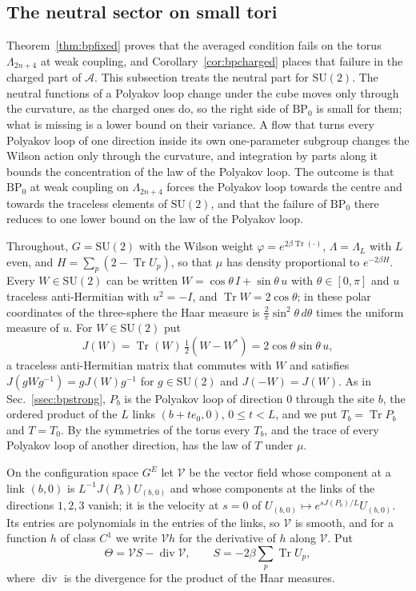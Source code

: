 \documentclass[aps,prd,twocolumn,superscriptaddress,nofootinbib,longbibliography,floatfix,amsmath,amssymb,10pt]{revtex4-2}
\theoremstyle{definition}
\theoremstyle{remark}
\newcommand{\SU}{\mathrm{SU}}
\newcommand{\Tr}{\operatorname{Tr}}
\begin{document}
\subsection{The neutral sector on small tori}\label{ssec:bpneutral}

Theorem~\ref{thm:bpfixed} proves that the averaged condition fails on the
torus $\Lambda_{2n+4}$ at weak coupling, and Corollary~\ref{cor:bpcharged}
places that failure in the charged part of $\mathcal A$. This subsection
treats the neutral part for $\SU(2)$. The neutral functions of a Polyakov
loop change under the cube moves only through the curvature, as the charged
ones do, so the right side of $\mathrm{BP}_0$ is small for them; what is
missing is a lower bound on their variance. A flow that turns every
Polyakov loop of one direction inside its own one-parameter subgroup changes
the Wilson action only through the curvature, and integration by parts along
it bounds the concentration of the law of the Polyakov loop. The outcome is
that $\mathrm{BP}_0$ at weak coupling on $\Lambda_{2n+4}$ forces the
Polyakov loop towards the centre and towards the traceless elements of
$\SU(2)$, and that the failure of $\mathrm{BP}_0$ there reduces to one
lower bound on the law of the Polyakov loop.

Throughout, $G=\SU(2)$ with the Wilson weight $\varphi=e^{2\beta\Tr(\cdot)}$,
$\Lambda=\Lambda_L$ with $L$ even, and $H=\sum_p(2-\Tr U_p)$, so that $\mu$
has density proportional to $e^{-2\beta H}$. Every $W\in\SU(2)$ can be
written $W=\cos\theta\,I+\sin\theta\,u$ with $\theta\in[0,\pi]$ and $u$
traceless anti-Hermitian with $u^2=-I$, and $\Tr W=2\cos\theta$; in these
polar coordinates of the three-sphere the Haar measure is $\frac2\pi\sin^2
\theta\,d\theta$ times the uniform measure of $u$. For $W\in\SU(2)$ put
\[
J(W)=\Tr(W)\,\tfrac12(W-W^*)=2\cos\theta\sin\theta\,u ,
\]
a traceless anti-Hermitian matrix that commutes with $W$ and satisfies
$J(gWg^{-1})=gJ(W)g^{-1}$ for $g\in\SU(2)$ and $J(-W)=J(W)$. As in
Sec.~\ref{ssec:bpstrong}, $P_b$ is the Polyakov loop of direction $0$
through the site $b$, the ordered product of the $L$ links $(b+te_0,0)$,
$0\le t<L$, and we put $T_b=\Tr P_b$ and $T=T_0$. By the symmetries of the
torus every $T_b$, and the trace of every Polyakov loop of another direction,
has the law of $T$ under $\mu$.

On the configuration space $G^E$ let $\mathcal V$ be the vector field whose
component at a link $(b,0)$ is $L^{-1}J(P_b)U_{(b,0)}$ and whose components
at the links of the directions $1,2,3$ vanish; it is the velocity at $s=0$
of $U_{(b,0)}\mapsto e^{sJ(P_b)/L}U_{(b,0)}$. Its entries are polynomials in
the entries of the links, so $\mathcal V$ is smooth, and for a function $h$
of class $C^1$ we write $\mathcal Vh$ for the derivative of $h$ along
$\mathcal V$. Put
\[
\Theta=\mathcal VS-\operatorname{div}\mathcal V,\qquad S=-2\beta\sum_p\Tr
U_p,
\]
where $\operatorname{div}$ is the divergence for the product of the Haar
measures.
\end{document}

